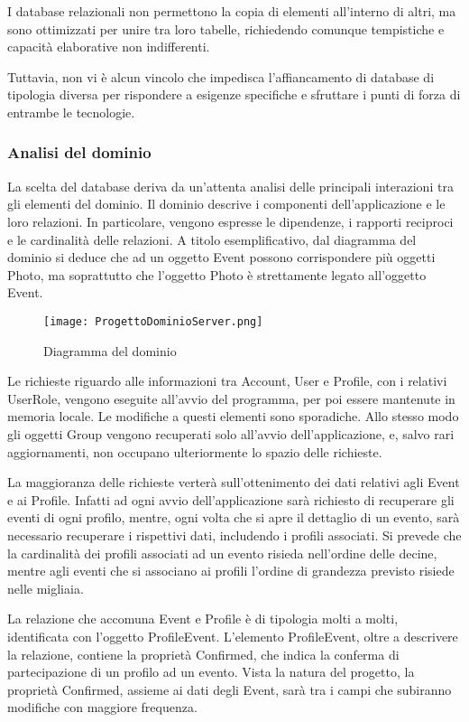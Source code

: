 I database relazionali non permettono la copia di elementi all’interno di altri, ma sono ottimizzati per unire tra loro tabelle, richiedendo comunque tempistiche e capacità elaborative non indifferenti. 

Tuttavia, non vi è alcun vincolo che impedisca l’affiancamento di database di tipologia diversa per rispondere a esigenze specifiche e sfruttare i punti di forza di entrambe le tecnologie.
	
\subsubsection{ Analisi del dominio}

La scelta del database deriva da un’attenta analisi delle principali interazioni tra gli elementi del dominio. Il dominio descrive i componenti dell’applicazione e le loro relazioni. In particolare, vengono espresse le dipendenze, i rapporti reciproci e le cardinalità delle relazioni. A titolo esemplificativo, dal diagramma del dominio si deduce che ad un oggetto Event possono corrispondere più oggetti Photo, ma soprattutto che l’oggetto Photo è strettamente legato all’oggetto Event.

\begin{figure}[h!]
    \centering
    \texttt{[image: ProgettoDominioServer.png]}
    \caption{ Diagramma del dominio}
\end{figure}
Le richieste riguardo alle informazioni tra Account, User e Profile, con i relativi UserRole, vengono eseguite all’avvio del programma, per poi essere mantenute in memoria locale. Le modifiche a questi elementi sono sporadiche.
Allo stesso modo gli oggetti Group vengono recuperati solo all’avvio dell’applicazione, e, salvo rari aggiornamenti, non occupano ulteriormente lo spazio delle richieste.

La maggioranza delle richieste verterà sull’ottenimento dei dati relativi agli Event e ai Profile. Infatti ad ogni avvio dell’applicazione sarà richiesto di recuperare gli eventi di ogni profilo, mentre, ogni volta che si apre il dettaglio di un evento, sarà necessario recuperare i rispettivi dati, includendo i profili associati. Si prevede che la cardinalità dei profili associati ad un evento risieda nell’ordine delle decine, mentre agli eventi che si associano ai profili l’ordine di grandezza previsto risiede nelle migliaia. 

La relazione che accomuna Event e Profile è di tipologia molti a molti, identificata con l’oggetto ProfileEvent. L’elemento ProfileEvent, oltre a descrivere la relazione, contiene la proprietà Confirmed, che indica la conferma di partecipazione di un profilo ad un evento. Vista la natura del progetto, la proprietà Confirmed, assieme ai dati degli Event, sarà tra i campi che subiranno modifiche con maggiore frequenza.

